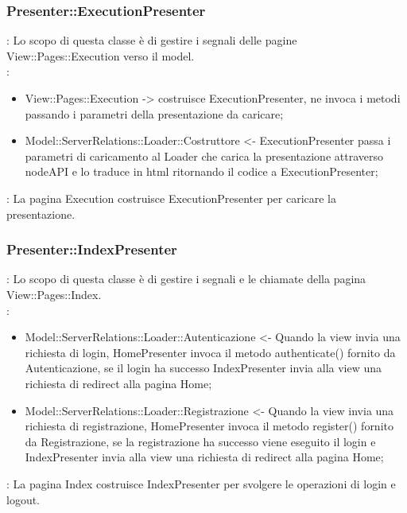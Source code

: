 {		\subsubsection{Presenter::ExecutionPresenter}{
				\textbf{\tipo}: Lo scopo di questa classe è di gestire i segnali delle pagine View::Pages::Execution verso il model.\\	
				\textbf{\relaz}:
					\begin{itemize}
						\item View::Pages::Execution -> costruisce ExecutionPresenter, ne invoca i metodi passando i parametri della presentazione da caricare;
						\item Model::ServerRelations::Loader::Costruttore <- ExecutionPresenter passa i parametri di caricamento al Loader che carica la presentazione attraverso nodeAPI e lo traduce in html ritornando il codice a ExecutionPresenter;
					\end{itemize}
				\textbf{\interfacce}: La pagina Execution costruisce ExecutionPresenter per caricare la presentazione.\\
		}
		
		\subsubsection{Presenter::IndexPresenter}{
						\textbf{\tipo}: Lo scopo di questa classe è di gestire i segnali e le chiamate della pagina View::Pages::Index.\\	
						\textbf{\relaz}:
							\begin{itemize}
								\item Model::ServerRelations::Loader::Autenticazione <- Quando la view invia una richiesta di login, HomePresenter invoca il metodo authenticate() fornito da Autenticazione, se il login ha successo IndexPresenter invia alla view una richiesta di redirect alla pagina Home;
								\item Model::ServerRelations::Loader::Registrazione <- Quando la view invia una richiesta di registrazione, HomePresenter invoca il metodo register() fornito da Registrazione, se la registrazione ha successo viene eseguito il login e IndexPresenter invia alla view una richiesta di redirect alla pagina Home;
							\end{itemize}
						\textbf{\interfacce}: La pagina Index costruisce IndexPresenter per svolgere le operazioni di login e logout.\\
				}
				
}
